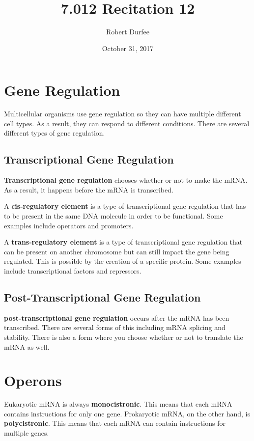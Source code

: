 \documentclass{article}
\title{7.012 Recitation 12}
\author{Robert Durfee}
\date{October 31, 2017}
\begin{document}
\maketitle

\section{Gene Regulation}

Multicellular organisms use gene regulation so they can have multiple different
cell types. As a result, they can respond to different conditions. There are
several different types of gene regulation.

\subsection{Transcriptional Gene Regulation}

\textbf{Transcriptional gene regulation} chooses whether or not to make the
mRNA. As a result, it happens before the mRNA is transcribed.

A \textbf{cis-regulatory element} is a type of transcriptional gene regulation
that has to be present in the same DNA molecule in order to be functional. Some
examples include operators and promoters.

A \textbf{trans-regulatory element} is a type of transcriptional gene regulation
that can be present on another chromosome but can still impact the gene being
regulated. This is possible by the creation of a specific protein. Some examples
include transcriptional factors and repressors.

\subsection{Post-Transcriptional Gene Regulation}

\textbf{post-transcriptional gene regulation} occurs after the mRNA has been
transcribed. There are several forms of this including mRNA splicing and
stability. There is also a form where you choose whether or not to translate the
mRNA as well.

\section{Operons}

Eukaryotic mRNA is always \textbf{monocistronic}. This means that each mRNA
contains instructions for only one gene. Prokaryotic mRNA, on the other hand, is
\textbf{polycistronic}. This means that each mRNA can contain instructions for
multiple genes. 
\end{document}
